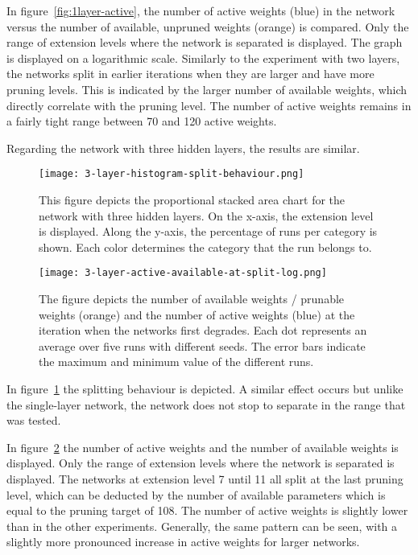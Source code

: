 In figure~\ref{fig:1layer-active}, the number of active weights (blue) in the network versus the number of available, unpruned weights (orange) is compared.
Only the range of extension levels where the network is separated is displayed.
The graph is displayed on a logarithmic scale.
Similarly to the experiment with two layers, the networks split in earlier iterations when they are larger and have more pruning levels.
This is indicated by the larger number of available weights, which directly correlate with the pruning level.
The number of active weights remains in a fairly tight range between 70 and 120 active weights.

Regarding the network with three hidden layers, the results are similar.
\begin{figure}[ht]
    \centering
    \texttt{[image: 3-layer-histogram-split-behaviour.png]}
    \caption{
        This figure depicts the proportional stacked area chart for the network with three hidden layers.
        On the x-axis, the extension level is displayed. 
        Along the y-axis, the percentage of runs per category is shown.
        Each color determines the category that the run belongs to.
    }\label{fig:3layer-histogram}
\end{figure}

\begin{figure}[ht] 
    \centering
    \texttt{[image: 3-layer-active-available-at-split-log.png]}
    \caption{
        The figure depicts the number of available weights / prunable weights (orange) and the number of active weights (blue) at the iteration when the networks first degrades.
    Each dot represents an average over five runs with different seeds.
    The error bars indicate the maximum and minimum value of the different runs.
    }\label{fig:3layer-active}
\end{figure}

In figure~\ref{fig:3layer-histogram} the splitting behaviour is depicted.
A similar effect occurs but unlike the single-layer network, the network does not stop to separate in the range that was tested. 

In figure~\ref{fig:3layer-active} the number of active weights and the number of available weights is displayed.
Only the range of extension levels where the network is separated is displayed.
The networks at extension level 7 until 11 all split at the last pruning level, which can be deducted by the number of available parameters which is equal to the pruning target of 108.
The number of active weights is slightly lower than in the other experiments.
Generally, the same pattern can be seen, with a slightly more pronounced increase in active weights for larger networks.

